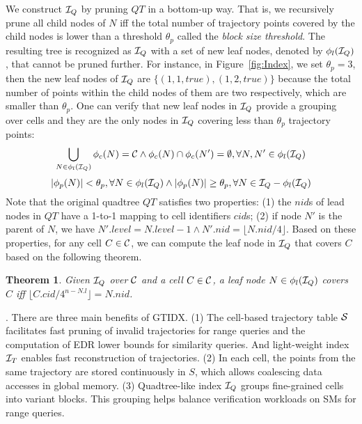 \documentclass[10pt,conference,letterpaper]{IEEEtran}
\newcommand{\idxname}{GTIDX\xspace }
\newcommand{\allcell}{{\cal C}\xspace}
\newcommand{\trajtable}{{\cal S}\xspace}
\newcommand{\trajindex}{{{\cal I}_T}\xspace}
\newcommand{\treeindex}{{{\cal I}_Q}\xspace}
\newtheorem{theorem}{Theorem}
\begin{document}
We construct $\treeindex$ by pruning $QT$ in a bottom-up way. That is, we recursively prune all child nodes of $N$ iff the total number of trajectory points covered by the child nodes is lower than a threshold $\theta_p$ called the \emph{block size threshold}. The resulting tree is recognized as $\treeindex$ with a set of new leaf nodes, denoted by $\phi_l(\treeindex)$, that cannot be pruned further. For instance, in Figure~\ref{fig:Index}, we set $\theta_p=3$, then the new leaf nodes of $\treeindex$ are $\{(1,1,true),(1,2,true)\}$ because the total number of points within the child nodes of them are two respectively, which are smaller than $\theta_p$. One can verify that new leaf nodes in $\treeindex$ provide a grouping over cells and they are the only nodes in $\treeindex$ covering less than $\theta_p$ trajectory points:
\begin{equation}\label{eq:cond1}
\small
\bigcup_{N\in\phi_l(\treeindex)} {\phi_c(N)}= \allcell  \wedge \phi_c(N)\cap \phi_c(N') = \emptyset, \forall N, N'\in\phi_l(\treeindex) 
\end{equation}
\begin{equation}\label{eq:cond2}
\small
|\phi_p(N)| < \theta_p, \forall N\in\phi_l(\treeindex) \wedge
|\phi_p(N)| \geq \theta_p, \forall N\in \treeindex-\phi_l(\treeindex)
\end{equation}
%
Note that the original quadtree $QT$ satisfies two properties: (1) the $nid$s of lead nodes in $QT$ have a 1-to-1 mapping to cell identifiers $cid$s; (2) if node $N'$ is the parent of $N$, we have $N'.level = N.level-1 \wedge N'.nid =  \lfloor N.nid/4 \rfloor$.
Based on these properties, for any cell $C\in\allcell$, we can compute the leaf node in $\treeindex$ that covers $C$ based on the following theorem.
%
\begin{theorem}\label{le:findleaf}
	Given $\treeindex$ over $\allcell$ and a cell $C\in\allcell$, a leaf node $N\in \phi_l(\treeindex)$ covers $C$ iff $\lfloor C.cid/4^{n-N.l}\rfloor = N.nid$.	
\end{theorem}




\vspace{0.1cm}{\bf Benefits of \idxname}.
There are three main benefits of \idxname.
%
(1) The cell-based trajectory table $\trajtable$ facilitates fast pruning of invalid trajectories for range queries and the computation of EDR lower bounds for similarity queries. And light-weight index $\trajindex$ enables fast reconstruction of trajectories.
(2) In each cell, the points from the same trajectory are stored continuously in $S$, which allows coalescing data accesses in global memory.
(3) Quadtree-like index $\treeindex$ groups fine-grained cells into variant blocks. This grouping helps balance verification workloads on SMs for range queries.
\end{document}
